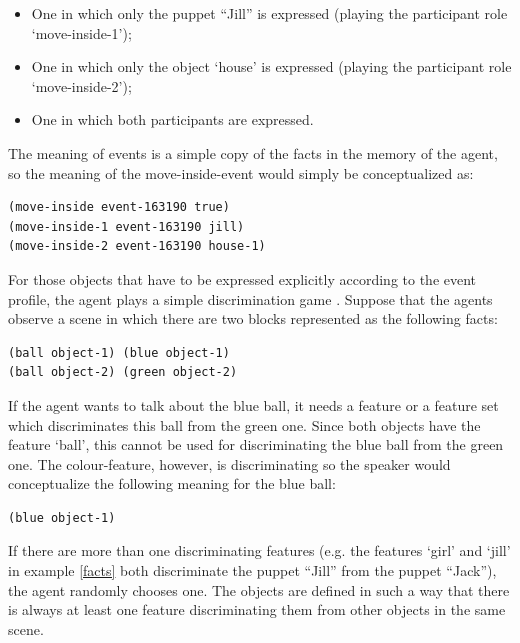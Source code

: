 \begin{itemize}
\item One in which only the puppet ``Jill'' is expressed (playing the participant role `move-inside-1');
\item One in which only the object `house' is expressed (playing the participant role `move-inside-2');
\item One in which both participants are expressed.
\end{itemize}

The meaning of events is a simple copy of the facts in the memory of the agent, so the meaning of the move-inside-event would simply be conceptualized as:

\ea
\label{facts2}
\begin{lstlisting}
(move-inside event-163190 true)
(move-inside-1 event-163190 jill)
(move-inside-2 event-163190 house-1)
\end{lstlisting}
\z

For those objects that have to be expressed explicitly according to the event profile, the agent plays a simple discrimination game \citep{steels96perceptually, steels97constructing}. Suppose that the agents observe a scene in which there are two blocks represented as the following facts:

\ea
\begin{lstlisting}
(ball object-1) (blue object-1)
(ball object-2) (green object-2)
\end{lstlisting}
\z

If the agent wants to talk about the blue ball, it needs a feature or a feature set which discriminates this ball from the green one. Since both objects have the feature `ball', this cannot be used for discriminating the blue ball from the green one. The colour-feature, however, is discriminating so the speaker would conceptualize the following meaning for the blue ball:

\ea
\begin{lstlisting}
(blue object-1)
\end{lstlisting}
\z

If there are more than one discriminating features (e.g. the features `girl' and `jill' in example \ref{facts} both discriminate the puppet ``Jill'' from the puppet ``Jack''), the agent randomly chooses one. The objects are defined in such a way that there is always at least one feature discriminating them from other objects in the same scene.

